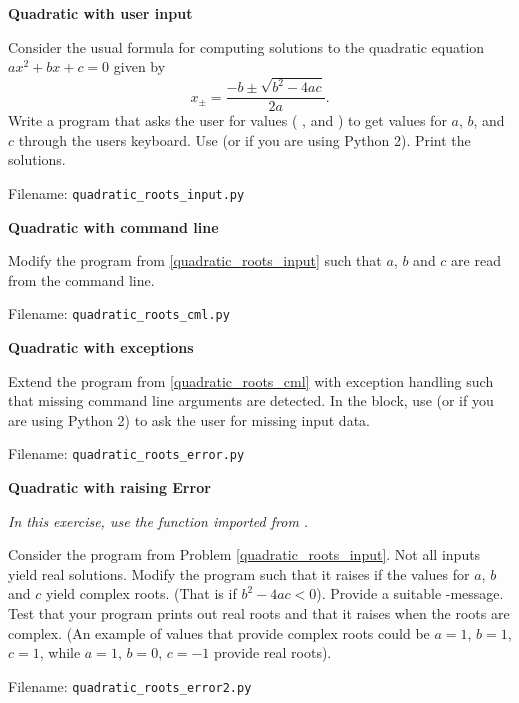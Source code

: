 
\begin{Problem}{\textbf{Quadratic with user input}} \label{quadratic_roots_input}

\noindent Consider the usual formula for computing solutions to the quadratic equation
$ax^2+bx+c=0$ given by
\begin{equation*}
    x_{\pm}=\frac{-b\pm\sqrt{b^2-4ac}}{2a}.
\end{equation*}
Write a program that asks the user for values ( ,  and  ) to get values for $a$, $b$, and $c$ through the users
keyboard. Use  (or  if you are using Python 2). Print the solutions.

Filename: \texttt{quadratic\_roots\_input.py}
\end{Problem}

\begin{Problem}{\textbf{Quadratic with command line}} \label{quadratic_roots_cml}

\noindent Modify the program from \ref{quadratic_roots_input} such that $a$, $b$ and $c$ are read from the command line.

Filename: \texttt{quadratic\_roots\_cml.py}
\end{Problem}


\begin{Problem}{\textbf{Quadratic with exceptions}}

\noindent Extend the program from \ref{quadratic_roots_cml} with exception handling such that missing command line arguments are
detected. In the  block, use  (or  if you are using Python 2) to ask
the user for missing input data.

Filename: \texttt{quadratic\_roots\_error.py}
\end{Problem}

\begin{Problem}{\textbf{Quadratic with raising Error}} \label{prob43} \
\begin{center}
\emph{In this exercise, use the  function imported from .}    
\end{center}
Consider the program from Problem \ref{quadratic_roots_input}. Not all inputs yield real solutions.  Modify the program such that it raises  if the values for $a$, $b$ and $c$ yield complex roots. (That is if $b^2 - 4ac < 0$). Provide a suitable -message. Test that your program prints out real roots and that it raises  when the roots are complex.
(An example of values that provide complex roots could be $a=1$, $b=1$, $c=1$, while $a=1$, $b=0$, $c=-1$ provide real roots).

Filename: \texttt{quadratic\_roots\_error2.py}
\end{Problem}

